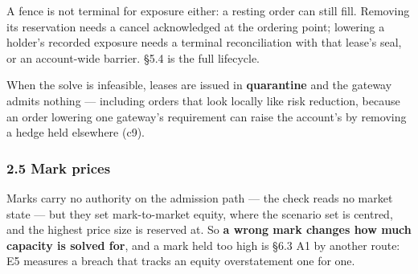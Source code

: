 \documentclass[10pt,a4paper]{article}
\begin{document}
A fence is not terminal for exposure either: a resting order can still fill.
Removing its reservation needs a cancel acknowledged at the ordering point;
lowering a holder's recorded exposure needs a terminal reconciliation with that
lease's seal, or an account-wide barrier. §5.4 is the full lifecycle.

When the solve is infeasible, leases are issued in \textbf{quarantine} and the gateway
admits nothing --- including orders that look locally like risk reduction, because
an order lowering one gateway's requirement can raise the account's by removing a
hedge held elsewhere (c9).

\subsubsection{2.5 Mark prices}\label{mark-prices}

Marks carry no authority on the admission path --- the check reads no market
state --- but they set mark-to-market equity, where the scenario set is centred,
and the highest price size is reserved at. So \textbf{a wrong mark changes how much
capacity is solved for}, and a mark held too high is §6.3 A1 by another route:
E5 measures a breach that tracks an equity overstatement one for one.
\end{document}
